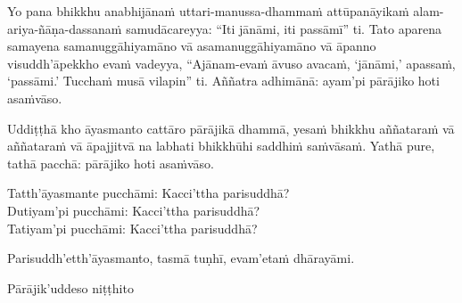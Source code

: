 Yo pana bhikkhu anabhijānaṁ uttari-manussa-dhammaṁ attūpanāyikaṁ alam-ariya-ñāṇa-dassanaṁ samudācareyya: “Iti jānāmi, iti passāmī” ti. Tato aparena samayena samanuggāhiyamāno vā asamanuggāhiyamāno vā āpanno visuddh'āpekkho evaṁ vadeyya, “Ajānam-evaṁ āvuso avacaṁ, ‘jānāmi,' apassaṁ, ‘passāmi.' Tucchaṁ musā vilapin” ti. Aññatra adhimānā: ayam'pi pārājiko hoti asaṁvāso.

\medskip

\begin{center}
Uddiṭṭhā kho āyasmanto cattāro pārājikā dhammā, yesaṁ bhikkhu aññataraṁ vā aññataraṁ vā āpajjitvā na labhati bhikkhūhi saddhiṁ saṁvāsaṁ. Yathā pure, tathā pacchā: pārājiko hoti asaṁvāso.

\smallskip

Tatth'āyasmante pucchāmi: Kacci'ttha parisuddhā?\\
Dutiyam'pi pucchāmi: Kacci'ttha parisuddhā?\\
Tatiyam'pi pucchāmi: Kacci'ttha parisuddhā?

\smallskip

Parisuddh'etth'āyasmanto, tasmā tuṇhī, evam'etaṁ dhārayāmi.
\end{center}

\begin{outro}
  Pārājik'uddeso niṭṭhito
\end{outro}

\clearpage
